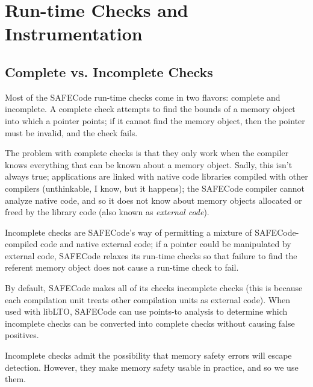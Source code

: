 \section{Run-time Checks and Instrumentation}
\label{section:checks}

\subsection{Complete vs. Incomplete Checks}
\label{section:checks:complete}

Most of the SAFECode run-time checks come in two flavors: complete
and incomplete.  A complete check attempts to find the bounds of a
memory object into which a pointer points; if it cannot find the
memory object, then the pointer must be invalid, and the check fails.

The problem with complete checks is that they only work when the
compiler knows everything that can be known about a memory object.
Sadly, this isn't always true; applications are linked with native
code libraries compiled with other compilers (unthinkable, I know, but
it happens); the SAFECode compiler cannot analyze native code, and so
it does not know about memory objects allocated or freed by the
library code (also known as \emph{external code}).

Incomplete checks are SAFECode's way of permitting a mixture of
SAFECode-compiled code and native external code; if a pointer could be
manipulated by external code, SAFECode relaxes its run-time checks so
that failure to find the referent memory object does not cause a
run-time check to fail.

By default, SAFECode makes all of its checks incomplete checks (this
is because each compilation unit treats other compilation units as
external code).  When used with libLTO, SAFECode can use points-to
analysis to determine which incomplete checks can be converted into
complete checks without causing false positives.

Incomplete checks admit the possibility that memory safety errors will escape
detection.  However, they make memory safety usable in practice, and
so we use them.


